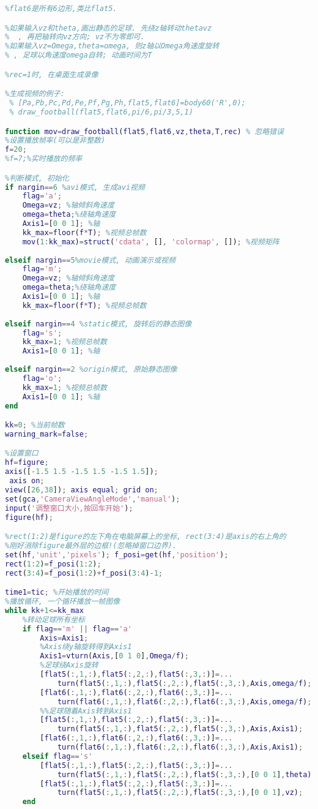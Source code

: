 \begin{lstlisting}[language=matlab, caption=draw\_football.m]
%画出足球,flat5是所有的5边形,第n个5边形的第ii个点的坐标就是flat5(ii,:,n)
%flat6是所有6边形,类比flat5.

%如果输入vz和theta,画出静态的足球. 先绕z轴转动thetavz
%  , 再把轴转向vz方向; vz不为零即可.
%如果输入vz=Omega,theta=omega, 则z轴以Omega角速度旋转
% , 足球以角速度omega自转; 动画时间为T

%rec=1时, 在桌面生成录像

%生成视频的例子:
 % [Pa,Pb,Pc,Pd,Pe,Pf,Pg,Ph,flat5,flat6]=body60('R',0);
 % draw_football(flat5,flat6,pi/6,pi/3,5,1)

function mov=draw_football(flat5,flat6,vz,theta,T,rec) % 忽略错误
%设置播放帧率(可以是非整数)
f=20;
%f=7;%实时播放的频率

%判断模式, 初始化
if nargin==6 %avi模式, 生成avi视频
    flag='a'; 
    Omega=vz; %轴倾斜角速度
    omega=theta;%绕轴角速度
    Axis1=[0 0 1]; %轴
    kk_max=floor(f*T); %视频总帧数
    mov(1:kk_max)=struct('cdata', [], 'colormap', []); %视频矩阵
    
elseif nargin==5%movie模式, 动画演示或视频
    flag='m'; 
    Omega=vz; %轴倾斜角速度
    omega=theta;%绕轴角速度
    Axis1=[0 0 1]; %轴
    kk_max=floor(f*T); %视频总帧数
    
elseif nargin==4 %static模式, 旋转后的静态图像
    flag='s'; 
    kk_max=1; %视频总帧数
    Axis1=[0 0 1]; %轴
    
elseif nargin==2 %origin模式, 原始静态图像
    flag='o'; 
    kk_max=1; %视频总帧数
    Axis1=[0 0 1]; %轴
end

kk=0; %当前帧数
warning_mark=false;

%设置窗口
hf=figure;  
axis([-1.5 1.5 -1.5 1.5 -1.5 1.5]); 
 axis on;
view([26,38]); axis equal; grid on;
set(gca,'CameraViewAngleMode','manual');
input('调整窗口大小,按回车开始');
figure(hf);

%rect(1:2)是figure的左下角在电脑屏幕上的坐标, rect(3:4)是axis的右上角的
%刚好消除figure最外层的边框!(忽略掉窗口边界).
set(hf,'unit','pixels'); f_posi=get(hf,'position');
rect(1:2)=f_posi(1:2);
rect(3:4)=f_posi(1:2)+f_posi(3:4)-1;

time1=tic; %开始播放的时间
%播放循环, 一个循环播放一帧图像
while kk+1<=kk_max
    %转动足球所有坐标
    if flag=='m' || flag=='a'
        Axis=Axis1;
        %Axis绕y轴旋转得到Axis1
        Axis1=vturn(Axis,[0 1 0],Omega/f);
        %足球绕Axis旋转
        [flat5(:,1,:),flat5(:,2,:),flat5(:,3,:)]=...
            turn(flat5(:,1,:),flat5(:,2,:),flat5(:,3,:),Axis,omega/f);
        [flat6(:,1,:),flat6(:,2,:),flat6(:,3,:)]=...
            turn(flat6(:,1,:),flat6(:,2,:),flat6(:,3,:),Axis,omega/f);
        %%足球随着Axis转到Axis1
        [flat5(:,1,:),flat5(:,2,:),flat5(:,3,:)]=...
            turn(flat5(:,1,:),flat5(:,2,:),flat5(:,3,:),Axis,Axis1);
        [flat6(:,1,:),flat6(:,2,:),flat6(:,3,:)]=...
            turn(flat6(:,1,:),flat6(:,2,:),flat6(:,3,:),Axis,Axis1);
    elseif flag=='s'
        [flat5(:,1,:),flat5(:,2,:),flat5(:,3,:)]=...
            turn(flat5(:,1,:),flat5(:,2,:),flat5(:,3,:),[0 0 1],theta);
        [flat5(:,1,:),flat5(:,2,:),flat5(:,3,:)]=...
            turn(flat5(:,1,:),flat5(:,2,:),flat5(:,3,:),[0 0 1],vz);
    end
    

\end{lstlisting}
